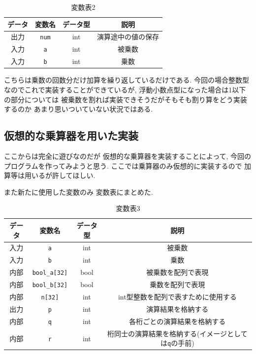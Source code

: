 \documentclass[a4paper, xelatex, ja=standard]{bxjsarticle}
\begin{document}
\begin{table}[h]
\centering
\caption{変数表2}
\label{}
\begin{tabular}{|c|c|c|c|}
\hline
データ & 変数名 & データ型 & 説明  \\ \hline
出力 & \texttt{num} & int  & 演算途中の値の保存 \\ \hline
入力 & \texttt{a} & int  & 被乗数 \\ \hline
入力 & \texttt{b} & int  & 乗数  \\ \hline
\end{tabular}
\end{table}
こちらは乗数の回数分だけ加算を繰り返しているだけである.
今回の場合整数型なのでこれで実装することができているが,
浮動小数点型になった場合は1以下の部分については
被乗数を割れば実装できそうだがそもそも割り算をどう実装するのか
あまり思いついていない状況ではある.

\subsection{仮想的な乗算器を用いた実装}
ここからは完全に遊びなのだが
仮想的な乗算器を実装することによって,
今回のプログラムを作ってみようと思う.
ここでは乗算器のみ仮想的に実装するので
加算等は用いるが許してほしい.

また新たに使用した変数のみ
変数表にまとめた.
\begin{table}[h]
\centering
\caption{変数表3}
\label{}
\begin{tabular}{|c|c|c|c|}
\hline
データ & 変数名 & データ型 & 説明  \\ \hline
入力 & \texttt{a} & int  & 被乗数 \\ \hline
入力 & \texttt{b} & int  & 乗数  \\ \hline
内部 & \texttt{bool\_a[32]} & bool  & 被乗数を配列で表現  \\ \hline
内部 & \texttt{bool\_b[32]} & bool  & 乗数を配列で表現  \\ \hline
内部 & \texttt{n[32]} & int  & int型整数を配列で表すために使用する  \\ \hline
出力 & \texttt{p} & int  & 演算結果を格納する  \\ \hline
内部 & \texttt{q} & int  & 各桁ごとの演算結果を格納する  \\ \hline
内部 & \texttt{r} & int  & 桁同士の演算結果を格納する(イメージとしては\texttt{q}の手前)  \\ \hline
\end{tabular}
\end{table}
\end{document}
